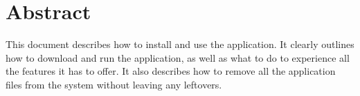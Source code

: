 \section{Abstract}
This document describes how to install and use the application.
It clearly outlines how to download and run the application, as well as what to do to experience all the features it has to offer.
It also describes how to remove all the application files from the system without leaving any leftovers.